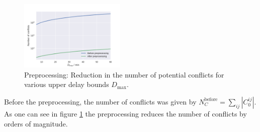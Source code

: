 \documentclass[aps,pra,twocolumn,10pt]{revtex4-1}
\begin{document}
\begin{figure}[t]
    \begin{center}
        \includegraphics[width=0.45\textwidth,natwidth=1,natheight=0]{./pics/preprocessing_reduction_number_of_conflicts.pdf}
    \end{center}
    \caption{Preprocessing: Reduction in the number of potential conflicts for various upper delay bounds $D_\text{max}$.}
    \label{fig:preprocessing_reduction_number_of_conflicts}
\end{figure}

Before the preprocessing, the number of conflicts was given by $N_C^\text{before} = \sum_{ij} |C^{ij}_0|$.
As one can see in figure \ref{fig:preprocessing_reduction_number_of_conflicts} the preprocessing reduces the number of conflicts by orders of magnitude.

\end{document}
